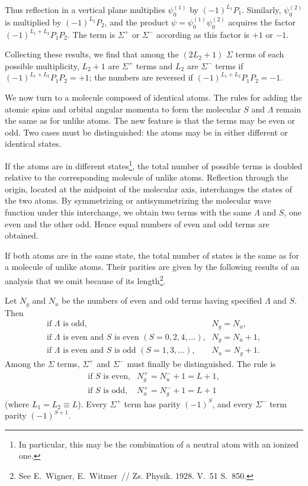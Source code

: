 Thus reflection in a vertical plane multiplies $\psi_0^{(1)}$ by $(-1)^{L_1}P_1$. Similarly, $\psi_0^{(2)}$ is multiplied by $(-1)^{L_2}P_2$, and the product $\psi=\psi_0^{(1)}\psi_0^{(2)}$ acquires the factor $(-1)^{L_1+L_2}P_1P_2$. The term is $\Sigma^+$ or $\Sigma^-$ according as this factor is $+1$ or $-1$.

Collecting these results, we find that among the $(2L_2+1)$ $\Sigma$ terms of each possible multiplicity, $L_2+1$ are $\Sigma^+$ terms and $L_2$ are $\Sigma^-$ terms if $(-1)^{L_1+L_2}P_1P_2=+1$; the numbers are reversed if $(-1)^{L_1+L_2}P_1P_2=-1$.

We now turn to a molecule composed of identical atoms. The rules for adding the atomic spins and orbital angular momenta to form the molecular $S$ and $\Lambda$ remain the same as for unlike atoms. The new feature is that the terms may be even or odd. Two cases must be distinguished: the atoms may be in either different or identical states.

If the atoms are in different states\footnote{In particular, this may be the combination of a neutral atom with an ionized one.}, the total number of possible terms is doubled relative to the corresponding molecule of unlike atoms. Reflection through the origin, located at the midpoint of the molecular axis, interchanges the states of the two atoms. By symmetrizing or antisymmetrizing the molecular wave function under this interchange, we obtain two terms with the same $\Lambda$ and $S$, one even and the other odd. Hence equal numbers of even and odd terms are obtained.

If both atoms are in the same state, the total number of states is the same as for a molecule of unlike atoms. Their parities are given by the following results of an analysis that we omit because of its length\footnote{See E.~Wigner, E.~Witmer~// Zs. Physik. 1928. V.~51 S.~850.}.

Let $N_g$ and $N_u$ be the numbers of even and odd terms having specified $\Lambda$ and $S$. Then
\[
\begin{array}{ll}
\text{if $\Lambda$ is odd,}&N_g=N_u,\\
\text{if $\Lambda$ is even and $S$ is even $(S=0,2,4,\ldots)$,}&N_g=N_u+1,\\
\text{if $\Lambda$ is even and $S$ is odd $(S=1,3,\ldots)$,}&N_u=N_g+1.
\end{array}
\]
Among the $\Sigma$ terms, $\Sigma^+$ and $\Sigma^-$ must finally be distinguished. The rule is
\[
\begin{array}{ll}
\text{if $S$ is even,}&N_g^+=N_u^-+1=L+1,\\
\text{if $S$ is odd,}&N_u^+=N_g^-+1=L+1
\end{array}
\]
(where $L_1=L_2\equiv L$). Every $\Sigma^+$ term has parity $(-1)^S$, and every $\Sigma^-$ term parity $(-1)^{S+1}$.

